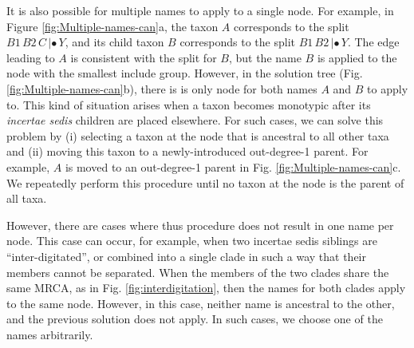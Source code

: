 \documentclass[english]{article}
\begin{document}
It is also possible for multiple names to apply to a single node. For example,
in Figure \ref{fig:Multiple-names-can}a, the taxon $A$ corresponds to the split
$B1\,B2\,C\,|\bullet\,Y$, and its child taxon $B$ corresponds to the split $B1\,B2\,|\bullet\,Y$. The
edge leading to $A$ is consistent with the split for $B$, but the name $B$ is
applied to the node with the smallest include group. However, in the
solution tree (Fig. \ref{fig:Multiple-names-can}b), there is is only node for
both names $A$ and $B$ to apply to.  This kind of situation arises when a taxon
becomes monotypic after its \emph{incertae sedis} children are placed elsewhere.
For such cases, we can solve this problem by (i) selecting a taxon at the
node that is ancestral to all other taxa and (ii) moving this taxon to a
newly-introduced out-degree-1 parent.  For example, $A$ is moved to an
out-degree-1 parent in Fig. \ref{fig:Multiple-names-can}c.  We repeatedly perform
this procedure until no taxon at the node is the parent of all taxa.

However, there are cases where thus procedure does not result in one name per
node.  This case can occur, for example, when two incertae sedis siblings are 
``inter-digitated'', or  combined into a single clade in such a way that their
members cannot be separated.  When the members of the two clades share the same
MRCA, as in Fig. \ref{fig:interdigitation}, then the names for both clades
apply to the same node.  However, in this case, neither name is ancestral to
the other, and the previous solution does not apply.  In such cases, we choose
one of the names arbitrarily.
\end{document}
